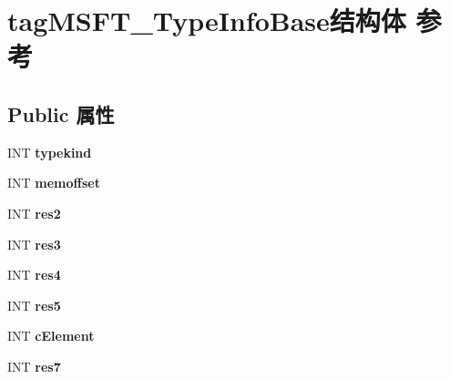 \hypertarget{structtag_m_s_f_t___type_info_base}{}\section{tag\+M\+S\+F\+T\+\_\+\+Type\+Info\+Base结构体 参考}
\label{structtag_m_s_f_t___type_info_base}
\subsection*{Public 属性}
\begin{DoxyCompactItemize}
\item 
\mbox{\label{structtag_m_s_f_t___type_info_base_a6c9944b890e4a6f2b02d9b30253c9730}} 
I\+NT {\bfseries typekind}
\item 
\mbox{\label{structtag_m_s_f_t___type_info_base_a9d58e5ffcdf5c880fbac9e58f1530303}} 
I\+NT {\bfseries memoffset}
\item 
\mbox{\label{structtag_m_s_f_t___type_info_base_a073ed2b9f0bccf38527fd74507842050}} 
I\+NT {\bfseries res2}
\item 
\mbox{\label{structtag_m_s_f_t___type_info_base_a87c3dab0a6b144888dfb0b86d29e4d52}} 
I\+NT {\bfseries res3}
\item 
\mbox{\label{structtag_m_s_f_t___type_info_base_afbdfaf235f946b8b3cf53c9de5e9177d}} 
I\+NT {\bfseries res4}
\item 
\mbox{\label{structtag_m_s_f_t___type_info_base_a80f4b0cd49a8fecda396c4a8689fd317}} 
I\+NT {\bfseries res5}
\item 
\mbox{\label{structtag_m_s_f_t___type_info_base_af9f7e6a31a3ab8867d3d6f19d37bfeca}} 
I\+NT {\bfseries c\+Element}
\item 
\mbox{\label{structtag_m_s_f_t___type_info_base_acbe816447000578a5ab4a21636638fc7}} 
I\+NT {\bfseries res7}
\item 

\end{DoxyCompactItemize}

